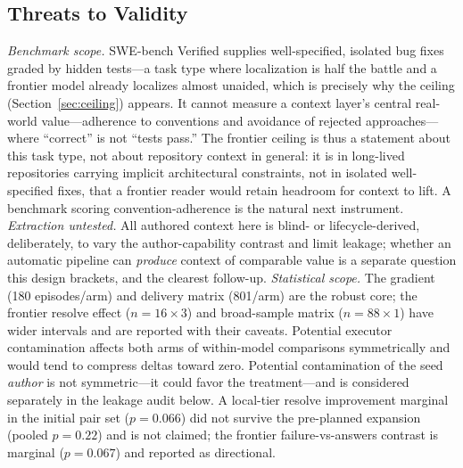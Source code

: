 \documentclass[sigconf,screen]{acmart}
\begin{document}
\subsection{Threats to Validity}\label{sec:threats}
\emph{Benchmark scope.} SWE-bench Verified supplies well-specified, isolated bug
fixes graded by hidden tests---a task type where localization is half the battle
and a frontier model already localizes almost unaided, which is precisely why the
ceiling (Section~\ref{sec:ceiling}) appears. It cannot measure a context layer's
central real-world value---adherence to conventions and avoidance of rejected
approaches---where ``correct'' is not ``tests pass.'' The frontier ceiling is thus
a statement about this task type, not about repository context in general: it is
in long-lived repositories carrying implicit architectural constraints, not in
isolated well-specified fixes, that a frontier reader would retain headroom for
context to lift. A benchmark scoring convention-adherence is the natural next
instrument. \emph{Extraction untested.} All authored context here is
blind- or lifecycle-derived, deliberately, to vary the author-capability contrast
and limit leakage; whether an automatic pipeline can \emph{produce} context of
comparable value is a separate question this design brackets, and the clearest
follow-up. \emph{Statistical scope.} The gradient (180 episodes/arm) and delivery
matrix (801/arm) are the robust core; the frontier resolve effect ($n=16\times3$)
and broad-sample matrix ($n=88\times1$) have wider intervals and are reported with
their caveats. Potential executor contamination affects both arms of within-model comparisons
symmetrically and would tend to compress deltas toward zero. Potential
contamination of the seed \emph{author} is not symmetric---it could favor the
treatment---and is considered separately in the leakage audit below. A local-tier resolve improvement
marginal in the initial pair set ($p = 0.066$) did not survive the pre-planned
expansion (pooled $p = 0.22$) and is not claimed; the frontier failure-vs-answers
contrast is marginal ($p = 0.067$) and reported as directional.
\end{document}
